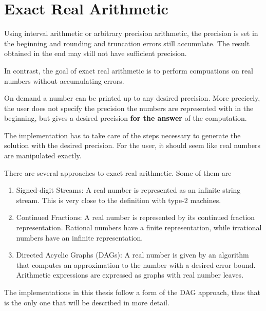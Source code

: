 \section{Exact Real Arithmetic}\label{sec:exact real arithmetic}
	Using interval arithmetic or arbitrary precision arithmetic, 
	the precision is set in the beginning and rounding and truncation errors still accumulate.
	The result obtained in the end may still not have sufficient precision.

	In contrast, the goal of exact real arithmetic is to perform compuations on real numbers without 
	accumulating errors.
  
  On demand a number can be printed up to any desired precision. 
	More precicely, the user does not specify the precision the numbers are represented with in the beginning,
	but gives a desired precision \textbf{for the answer} of the computation.
  
  The implementation has to take care of the steps necessary to generate the
  solution with the desired precision.
  For the user, it should seem like real numbers are manipulated exactly.

	There are several approaches to exact real arithmetic.
	Some of them are
  \begin{enumerate}
     \item Signed-digit Streams: A real number is represented as an infinite
       string stream. This is very close to the definition with type-2
       machines.
     \item Continued Fractions: A real number is represented by its continued
       fraction representation. Rational numbers have a finite representation,
       while irrational numbers have an infinite representation.
     \item Directed Acyclic Graphs (DAGs): A real number is given by an
       algorithm that computes an approximation to the number with a desired
       error bound. Arithmetic expressions are expressed as graphs with real
       number leaves.
  \end{enumerate}
  The implementations in this thesis follow a form of the DAG approach, thus
  that is the only one that will be described in more detail.
